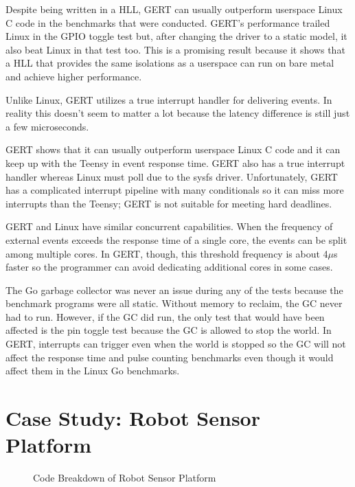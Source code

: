 Despite being written in a HLL, GERT can usually outperform userspace
Linux C code in the benchmarks that were conducted. GERT's performance trailed
Linux in the GPIO toggle test but, after changing the driver to a static model,
it also beat Linux in that test too. This is a promising result because it shows
that a HLL that provides the same isolations as a userspace can run on bare metal
and achieve higher performance.

Unlike Linux, GERT utilizes a true interrupt handler for delivering events.
In reality this doesn't seem to matter a lot because the latency difference
is still just a few microseconds.


GERT shows that it can usually outperform userspace Linux C code and it
can keep up with the Teensy in event response time. GERT also has a true interrupt
handler whereas Linux must poll due to the sysfs driver. Unfortunately, GERT
has a complicated interrupt pipeline with many conditionals so it can miss
more interrupts than the Teensy; GERT is not suitable for meeting hard deadlines.

GERT and Linux have similar concurrent capabilities. When the frequency of external
events exceeds the response time of a single core, the events can be split among
multiple cores. In GERT, though, this threshold frequency is about 4$\mu$s faster
so the programmer can avoid dedicating additional cores in some cases.


The Go garbage collector was never an issue during any of the tests because the
benchmark programs were all static. Without memory to reclaim, the GC never
had to run. However, if the GC did run, the only test that would have been affected is
the pin toggle test because the GC is allowed to stop the world. In GERT, interrupts
can trigger even when the world is stopped so the GC will not affect the response time
and pulse counting benchmarks even though it would affect them in the Linux Go benchmarks.

\section{Case Study: Robot Sensor Platform} \label{sec:robot}

\begin{figure}[h]
  \begin{center}
 \end{center}
  \caption{Code Breakdown of Robot Sensor Platform} \label{fig:robot_code}
\end{figure}


